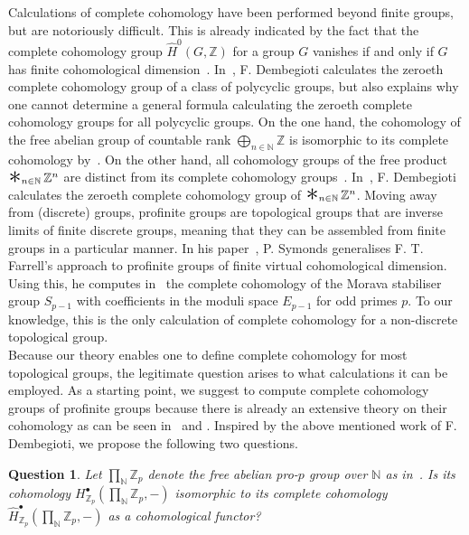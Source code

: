 \documentclass[12pt,a4paper]{article}
\numberwithin{equation}{section}
\newtheorem{ques}[thm]{Question}
\theoremstyle{nonumberplain}
\newcommand{\bigast}{\mathop{\scalebox{2}{\raisebox{-0.1ex}{$\ast$}}}}%
\begin{document}
Calculations of complete cohomology have been performed beyond finite groups, but are notoriously difficult. This is already indicated by the fact that the complete cohomology group $\widehat{H}^0(G, \mathbb{Z})$ for a group $G$ vanishes if and only if $G$ has finite cohomological dimension~\cite[Lemma~4.2.4]{kro95}. In~\cite{dem08}, F.\! Dembegioti calculates the zeroeth complete cohomology group of a class of polycyclic groups, but also explains why one cannot determine a general formula calculating the zeroeth complete cohomology groups for all polycyclic groups. On the one hand, the cohomology of the free abelian group of countable rank $\bigoplus_{n \in \mathbb{N}} \mathbb{Z}$ is isomorphic to its complete cohomology by~\cite[p.~297]{mis94}. On the other hand, all cohomology groups of the free product $\bigast_{n \in \mathbb{N}} \mathbb{Z}^n$ are distinct from its complete cohomology groups~\cite[p.~432]{jo09}. In~\cite[Corollary~2.4 and Theorem~A]{dem05}, F.\! Dembegioti calculates the zeroeth complete cohomology group of $\bigast_{n \in \mathbb{N}} \mathbb{Z}^n$. Moving away from (discrete) groups, profinite groups are topological groups that are inverse limits of finite discrete groups, meaning that they can be assembled from finite groups in a particular manner. In his paper~\cite[p.~34]{sym07}, P.\! Symonds generalises F.\! T.\! Farrell's approach to profinite groups of finite virtual cohomological dimension. Using this, he computes in~\cite{sym04} the complete cohomology of the Morava stabiliser group $S_{p-1}$ with coefficients in the moduli space $E_{p-1}$ for odd primes $p$. To our knowledge, this is the only calculation of complete cohomology for a non-discrete topological group. \\

Because our theory enables one to define complete cohomology for most topological groups, the legitimate question arises to what calculations it can be employed. As a starting point, we suggest to compute complete cohomology groups of profinite groups because there is already an extensive theory on their cohomology as can be seen in~\cite{rib10} and \cite{wil98}. Inspired by the above mentioned work of F.\! Dembegioti, we propose the following two questions.

\begin{ques}
Let $\prod_{\mathbb{N}} \mathbb{Z}_p$ denote the free abelian pro-$p$ group over $\mathbb{N}$ as in~\cite[Example~3.3.8(c)]{rib10}. Is its cohomology $H_{\mathbb{Z}_p}^{\bullet}(\prod_{\mathbb{N}} \mathbb{Z}_p, -)$ isomorphic to its complete cohomology $\widehat{H}_{\mathbb{Z}_p}^{\bullet}(\prod_{\mathbb{N}} \mathbb{Z}_p, -)$ as a cohomological functor?
\end{ques}
\end{document}
